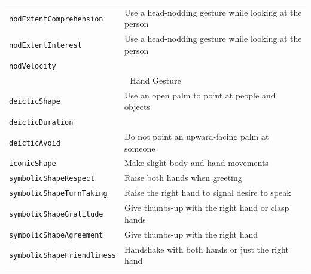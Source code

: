 \documentclass{CSSRforAfrica}
\begin{document}
\begin{table}[H]
\begin{center}
\begin{tabular}{|l l|}
{\footnotesize \verb+nodExtentComprehension+} 	           & {\footnotesize \verb++ Use a head-nodding gesture while looking at the  person}\vspace{-1.01mm} \\
{\footnotesize \verb+nodExtentInterest+} 	                           & {\footnotesize \verb++ Use a head-nodding gesture while looking at the  person} \vspace{-1.01mm} \\
{\footnotesize \verb+nodVelocity+} 	                                 & {\footnotesize \verb++} \\
\hline
\multicolumn{2}{|c|}{{\footnotesize Hand Gesture}} \vspace{-0mm}\\
\hline
{\footnotesize \verb+deicticShape+} 	                 & {\footnotesize \verb++  Use an open palm to point at people and objects} \vspace{-1.01mm}\\
{\footnotesize \verb+deicticDuration+} 	                 & {\footnotesize \verb++} \vspace{-1.01mm}\\
{\footnotesize \verb+deicticAvoid+} 	                 & {\footnotesize \verb++ Do not point an upward-facing palm at someone} \vspace{-1.01mm}\\
{\footnotesize \verb+iconicShape+} 	                 & {\footnotesize \verb++ Make slight body and hand movements} \vspace{-1.01mm}\\
{\footnotesize \verb+symbolicShapeRespect+} 	                 & {\footnotesize \verb++ Raise both hands when greeting}\vspace{-1.01mm} \\
{\footnotesize \verb+symbolicShapeTurnTaking+} 	                 & {\footnotesize \verb++ Raise the right hand to signal desire to speak}\vspace{-1.01mm} \\
{\footnotesize \verb+symbolicShapeGratitude+} 	                 & {\footnotesize \verb++ Give thumbs-up with the right hand or clasp hands}\vspace{-1.01mm} \\
{\footnotesize \verb+symbolicShapeAgreement+}   & {\footnotesize \verb++ Give  thumbs-up with the right hand}\vspace{-1.01mm} \\
{\footnotesize \verb+symbolicShapeFriendliness+}  & {\footnotesize \verb++ Handshake with both hands or just the right hand}\vspace{-1.01mm} \\

\end{tabular}
\end{center}
\end{table}
\end{document}
